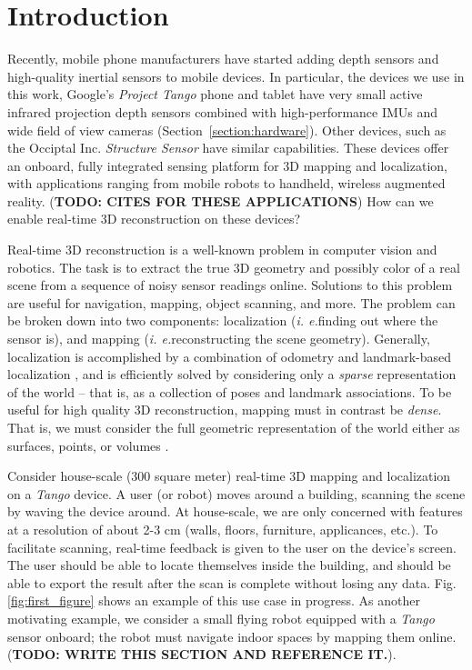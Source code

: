 \documentclass[conference]{IEEEtran}
\newcommand{\sref}[1]{Section~\ref{#1}}
\newcommand{\figref}[1]{Fig.\ref{#1}}
\newcommand{\ie}{\textit{i. e.}}
\begin{document}
\section{Introduction}
Recently, mobile phone manufacturers have started adding
depth sensors and high-quality inertial sensors to mobile devices. In
particular, the devices we use in this work, Google's \textit{Project Tango} \cite{Tango}
phone and tablet have very small active infrared projection depth sensors
combined with high-performance IMUs and wide field of view cameras
(\sref{section:hardware}). Other devices, such as the Occiptal Inc.
\textit{Structure Sensor} \cite{StructureSensor} have similar capabilities.
These devices offer an onboard, fully integrated sensing platform for 3D mapping
and localization, with applications ranging from mobile robots to handheld,
wireless augmented reality. (\textbf{TODO: CITES FOR THESE APPLICATIONS})  How
can we enable real-time 3D reconstruction on these devices?

Real-time 3D reconstruction is a well-known problem in computer vision and
robotics. The task is to extract the true 3D geometry and possibly color of a
real scene from a sequence of noisy sensor readings online. Solutions to this
problem are useful for navigation, mapping, object scanning, and more. The
problem can be broken down into two components: localization (\ie finding out
where the sensor is), and mapping (\ie reconstructing the scene geometry). 
Generally, localization is accomplished by a combination of odometry \cite{VINS} and landmark-based
localization \cite{FastSlam}, and is efficiently solved by considering only a
\textit{sparse} representation of the world -- that is, as a collection of
poses and landmark associations. To be useful for high quality 3D
reconstruction, mapping must in contrast be \textit{dense}.  That is, we must
consider the full geometric representation of the world either as surfaces,
points, or volumes \cite{Hartley2004}.

Consider house-scale (300 square meter) real-time 3D mapping and localization on
a \textit{Tango} device.  A user (or robot) moves around a building, scanning
the scene by waving the device around. At house-scale, we are only concerned with features
at a resolution of about 2-3 cm (walls, floors, furniture, applicances, etc.).
To facilitate scanning, real-time feedback is given to the user on the device's
screen. The user should be able to locate themselves inside the building, and
should be able to export the result after the scan is complete without losing any data.
\figref{fig:first_figure} shows an example of this use case in progress. As
another motivating example, we consider a small flying robot equipped with a
\textit{Tango} sensor onboard; the robot must navigate indoor spaces by mapping
them online. (\textbf{TODO: WRITE THIS SECTION AND REFERENCE IT.}).
\end{document}
